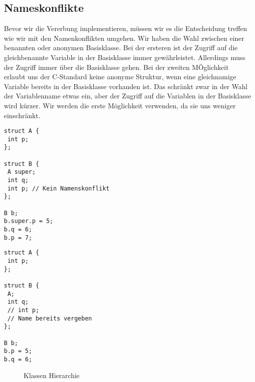 \documentclass{article}
\begin{document}
\subsection{Nameskonflikte}

Bevor wir die Vererbung implementieren, müssen wir es die Entscheidung treffen wie wir mit den Namenkonflikten umgehen.
Wir haben die Wahl zwischen einer benannten oder anonymen Basisklasse.
Bei der ersteren ist der Zugriff auf die gleichbenannte Variable in der Basisklasse immer gewährleistet.
Allerdings muss der Zugriff immer über die Basisklasse gehen.
Bei der zweiten MÖglichkeit erlaubt uns der C-Standard keine anonyme Struktur, wenn eine gleichnamige Variable bereits in der Basisklasse vorhanden ist.
Das schränkt zwar in der Wahl der Variablenname etwas ein, aber der Zugriff auf die Variablen in der Basisklasse wird kürzer.
Wir werden die erste Möglichkeit verwenden, da sie uns weniger einschränkt.

\noindent\begin{minipage}{.45\textwidth}
\begin{verbatim}
struct A {
 int p;
};

struct B {
 A super;
 int q;
 int p; // Kein Namenskonflikt
};

B b;
b.super.p = 5;
b.q = 6;
b.p = 7;
\end{verbatim}
\end{minipage}\hfill
\begin{minipage}{.45\textwidth}
\begin{verbatim}
struct A {
 int p;
};

struct B {
 A;
 int q;
 // int p; 
 // Name bereits vergeben
};

B b;
b.p = 5;
b.q = 6;
\end{verbatim}
\end{minipage}











\begin{figure}[h]
	\centering
{}
\caption{Klassen Hierarchie}
\label{fig:hierarchy}
\end{figure}
\end{document}
